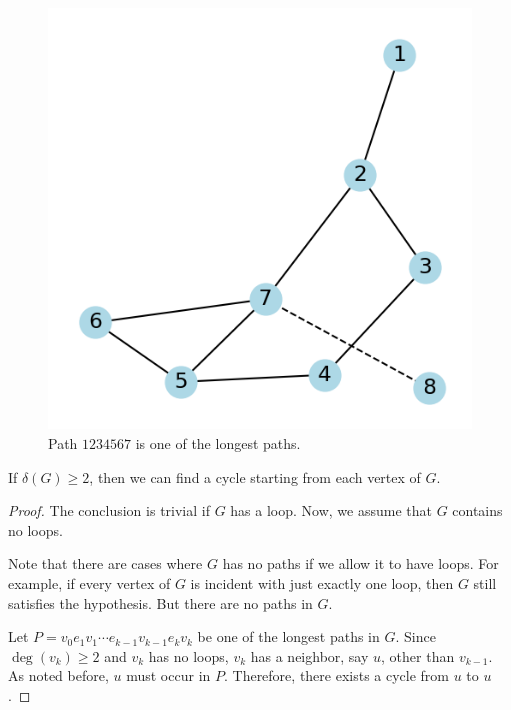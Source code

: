 \documentclass[thmcnt=section, 12pt, color=cyan]{my-elegantbook}
\begin{document}
\begin{figure}[ht]
    \centering
    \includegraphics[scale=0.7]{figures/g-001.png}
    \caption{Path $1234567$ is one of the longest paths.}
    \label{fig:1}
\end{figure}


\begin{proposition}
    If $\delta(G) \geq 2$, then we can find a cycle starting from each vertex of $G$.
\end{proposition}

\begin{proof}
    The conclusion is trivial if $G$ has a loop. Now, we assume that $G$ contains no loops. 
    \begin{note}
        Note that there are cases where $G$ has no paths if we allow it to have loops. For example, if every vertex of $G$ is incident with just exactly one loop, then $G$ still satisfies the hypothesis. But there are no paths in $G$.
    \end{note}
    \noindent Let $P = v_0 e_1 v_1 \cdots e_{k-1} v_{k-1} e_k v_k$ be one of the longest paths in $G$. Since $\deg(v_k) \geq 2$ and $v_k$ has no loops, $v_k$ has a neighbor, say $u$, other than $v_{k-1}$. As noted before, $u$ must occur in $P$. Therefore, there exists a cycle from $u$ to $u$.
\end{proof}
\end{document}
